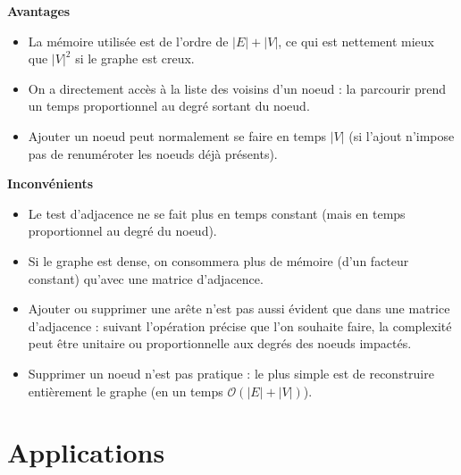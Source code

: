 \begin{minipage}[t]{.47\linewidth}
\begin{center}
\textbf{Avantages}
\end{center}
\begin{itemize}
\item La mémoire utilisée est de l’ordre de $|E| + |V|$, ce qui est nettement mieux que $|V|^2$ si le graphe est
creux.
\item On a directement accès à la liste des voisins d’un noeud : la parcourir prend un temps proportionnel
au degré sortant du noeud.%
\item Ajouter un noeud peut normalement se faire en temps $|V|$ (si l’ajout n’impose pas de renuméroter
les noeuds déjà présents).
\end{itemize}
\end{minipage}
\hfill
\begin{minipage}[t]{.47\linewidth}
\begin{center}
\textbf{Inconvénients}
\begin{itemize}
\item Le test d’adjacence ne se fait plus en temps constant (mais en temps proportionnel au degré du
noeud).
\item Si le graphe est dense, on consommera plus de mémoire (d’un facteur constant) qu’avec une matrice
d’adjacence.
\item Ajouter ou supprimer une arête n’est pas aussi évident que dans une matrice d’adjacence : suivant
l’opération précise que l’on souhaite faire, la complexité peut être unitaire ou proportionnelle aux
degrés des noeuds impactés.
\item  Supprimer un noeud n’est pas pratique : le plus simple est de reconstruire entièrement le graphe (en
un temps $\mathcal{O}\left(|E| + |V|\right)$).
\end{itemize}
\end{center}
\end{minipage}

\section{Applications}

